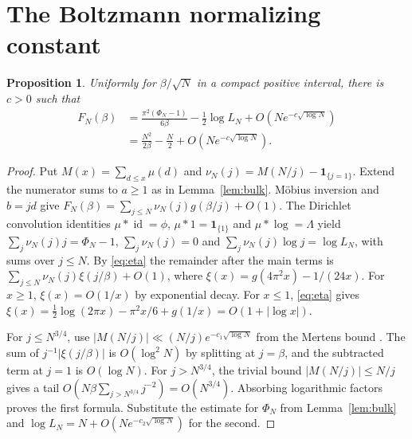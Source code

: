 \documentclass[11pt]{amsart}
\newtheorem{proposition}[theorem]{Proposition}
\theoremstyle{remark}
\begin{document}
\appendix
\section{The Boltzmann normalizing constant}\label{sec:free-energy}

\begin{proposition}\label{prop:free-energy-refined}
Uniformly for \(\beta/\sqrt N\) in a compact positive interval,
there is \(c>0\) such that
\begin{align*}
 F_N(\beta)&=\frac{\pi^2(\Phi_N-1)}{6\beta}-\tfrac12\log L_N
              +O(Ne^{-c\sqrt{\log N}})\\
           &=\frac{N^2}{2\beta}-\frac N2+O(Ne^{-c\sqrt{\log N}}).
\end{align*}
\end{proposition}
\begin{proof}
Put \(M(x)=\sum_{d\le x}\mu(d)\) and
\(\nu_N(j)=M(N/j)-\mathbf1_{\{j=1\}}\).
Extend the numerator sums to \(a\ge1\) as in Lemma~\ref{lem:bulk}.
M\"obius inversion and \(b=jd\) give
\(F_N(\beta)=\sum_{j\le N}\nu_N(j)g(\beta/j)+O(1)\).
The Dirichlet convolution identities \(\mu*\operatorname{id}=\phi\),
\(\mu*1=\mathbf1_{\{1\}}\) and \(\mu*\log=\Lambda\) yield
\(\sum_j\nu_N(j)j=\Phi_N-1\), \(\sum_j\nu_N(j)=0\) and
\(\sum_j\nu_N(j)\log j=\log L_N\), with sums over \(j\le N\).
By \eqref{eq:eta} the remainder after the main terms is
\(\sum_{j\le N}\nu_N(j)\xi(j/\beta)+O(1)\), where
\(\xi(x)=g(4\pi^2x)-1/(24x)\).
For \(x\ge1\), \(\xi(x)=O(1/x)\) by exponential decay.
For \(x\le1\), \eqref{eq:eta} gives
\(\xi(x)=\tfrac12\log(2\pi x)-\pi^2x/6+g(1/x)=O(1+|\log x|)\).

For \(j\le N^{3/4}\), use
\(|M(N/j)|\ll(N/j)e^{-c_1\sqrt{\log N}}\)
from the Mertens bound \cite[(6.17)]{montgomery-vaughan}.
The sum of \(j^{-1}|\xi(j/\beta)|\) is \(O(\log^2 N)\)
by splitting at \(j=\beta\), and the subtracted term at \(j=1\)
is \(O(\log N)\). For \(j>N^{3/4}\), the trivial bound
\(|M(N/j)|\le N/j\) gives a tail \(O(N\beta\sum_{j>N^{3/4}}j^{-2})
=O(N^{3/4})\).
Absorbing logarithmic factors proves the first formula. Substitute the
estimate for \(\Phi_N\) from Lemma~\ref{lem:bulk} and
\(\log L_N=N+O(Ne^{-c_2\sqrt{\log N}})\)
\cite[(6.12)]{montgomery-vaughan} for the second.
\end{proof}
\end{document}
